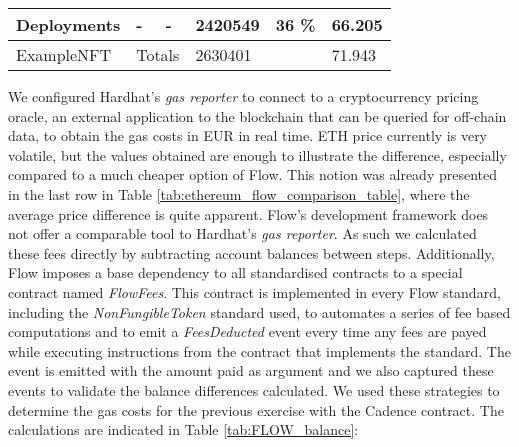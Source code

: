 \documentclass[../NFTComp_IEEE.tex]{subfiles}
\begin{document}
\begin{table}[ht]
{\begin{tabular}{|ll|ll|l|ll|}
            \multicolumn{2}{|l|}{Deployments}          & \multicolumn{1}{l|}{-}                                                            & -                          & 2420549                                                                           & \multicolumn{1}{l|}{36 \%} & 66.205                                    \\ \hline
            \multicolumn{2}{|l|}{ExampleNFT}           & \multicolumn{2}{l|}{Totals}                                                       & 2630401                    & \multicolumn{1}{l|}{}                                                             & 71.943                                                                 \\ \hline
        \end{tabular}%
    }
\end{table}

We configured Hardhat's \textit{gas reporter} to connect to a cryptocurrency pricing oracle, an external application to the blockchain that can be queried for off-chain data, to obtain the gas costs in EUR in real time. ETH price currently is very volatile, but the values obtained are enough to illustrate the difference, especially compared to a much cheaper option of Flow. This notion was already presented in the last row in Table \ref{tab:ethereum_flow_comparison_table}, where the average price difference is quite apparent. Flow's development framework does not offer a comparable tool to Hardhat's \textit{gas reporter}. As such we calculated these fees directly by subtracting account balances between steps. Additionally, Flow imposes a base dependency to all standardised contracts to a special contract named \textit{FlowFees}. This contract is implemented in every Flow standard, including the \textit{NonFungibleToken} standard used, to automates a series of fee based computations and to emit a \textit{FeesDeducted} event every time any fees are payed while executing instructions from the contract that implements the standard. The event is emitted with the amount paid as argument and we also captured these events to validate the balance differences calculated. We used these strategies to determine the gas costs for the previous exercise with the Cadence contract. The calculations are indicated in Table \ref{tab:FLOW_balance}:
\end{document}
